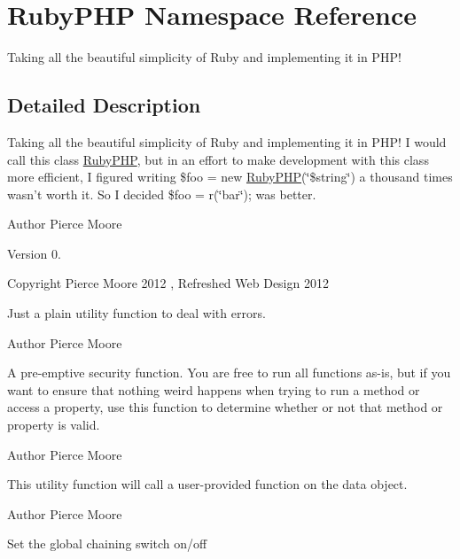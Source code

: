 \hypertarget{namespace_ruby_p_h_p}{\section{Ruby\-P\-H\-P Namespace Reference}
\label{namespace_ruby_p_h_p}
}


Taking all the beautiful simplicity of Ruby and implementing it in P\-H\-P!  




\subsection{Detailed Description}
Taking all the beautiful simplicity of Ruby and implementing it in P\-H\-P! I would call this class \hyperlink{namespace_ruby_p_h_p}{Ruby\-P\-H\-P}, but in an effort to make development with this class more efficient, I figured writing \$foo = new \hyperlink{namespace_ruby_p_h_p}{Ruby\-P\-H\-P}(\char`\"{}\$string\char`\"{}) a thousand times wasn't worth it. So I decided \$foo = r(\char`\"{}bar\char`\"{}); was better.

\begin{DoxyAuthor}{Author}
Pierce Moore 
\end{DoxyAuthor}
\begin{DoxyVersion}{Version}
0. 
\end{DoxyVersion}
\begin{DoxyCopyright}{Copyright}
Pierce Moore 2012 , Refreshed Web Design 2012
\end{DoxyCopyright}
Just a plain utility function to deal with errors.

\begin{DoxyAuthor}{Author}
Pierce Moore
\end{DoxyAuthor}
A pre-\/emptive security function. You are free to run all functions as-\/is, but if you want to ensure that nothing weird happens when trying to run a method or access a property, use this function to determine whether or not that method or property is valid.

\begin{DoxyAuthor}{Author}
Pierce Moore
\end{DoxyAuthor}
This utility function will call a user-\/provided function on the data object.

\begin{DoxyAuthor}{Author}
Pierce Moore
\end{DoxyAuthor}
Set the global chaining switch on/off


